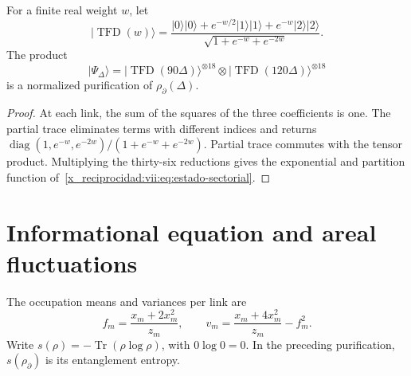 \begin{proposition}
\label{x_reciprocidad:vii:prop:purificacion-sectorial}
For a finite real weight \(w\), let
\begin{equation}
 |\operatorname{TFD}(w)\rangle
 =\frac{|0\rangle|0\rangle+e^{-w/2}|1\rangle|1\rangle
                   +e^{-w}|2\rangle|2\rangle}
        {\sqrt{1+e^{-w}+e^{-2w}}}.
 \label{x_reciprocidad:vii:eq:tfd-local}
\end{equation}
The product
\begin{equation}
 |\Psi_\Delta\rangle
 =|\operatorname{TFD}(90\Delta)\rangle^{\otimes18}
  \otimes|\operatorname{TFD}(120\Delta)\rangle^{\otimes18}
 \label{x_reciprocidad:vii:eq:tfd-sectorial}
\end{equation}
is a normalized purification of \(\rho_\partial(\Delta)\).
\end{proposition}
\begin{proof}
At each link, the sum of the squares of the three coefficients is one.
The partial trace eliminates terms with different indices and returns
\(\operatorname{diag}(1,e^{-w},e^{-2w})/(1+e^{-w}+e^{-2w})\).
Partial trace commutes with the tensor product. Multiplying the
thirty-six reductions gives the exponential and partition function
of~\eqref{x_reciprocidad:vii:eq:estado-sectorial}.
\end{proof}

\section{Informational equation and areal fluctuations}
\label{x_reciprocidad:vii:subsec:ecuacion-informacional}

The occupation means and variances per link are
\begin{equation}
 f_m=\frac{x_m+2x_m^2}{z_m},\qquad
 v_m=\frac{x_m+4x_m^2}{z_m}-f_m^2.
 \label{x_reciprocidad:vii:eq:momentos-sectoriales}
\end{equation}
Write \(s(\rho)=-\operatorname{Tr}(\rho\log\rho)\), with
\(0\log0=0\). In the preceding purification, \(s(\rho_\partial)\)
is its entanglement entropy.

